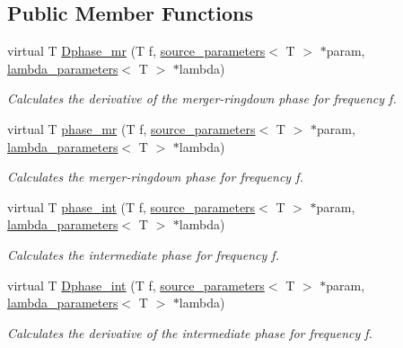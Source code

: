 \subsection*{Public Member Functions}
\begin{DoxyCompactItemize}
\item 
virtual T \hyperlink{classppE__IMRPhenomD__IMR_a3fa643eca535e7bef26f70bd5ed4cbde}{Dphase\+\_\+mr} (T f, \hyperlink{structsource__parameters}{source\+\_\+parameters}$<$ T $>$ $\ast$param, \hyperlink{structlambda__parameters}{lambda\+\_\+parameters}$<$ T $>$ $\ast$lambda)
\begin{DoxyCompactList}\small\item\em Calculates the derivative of the merger-\/ringdown phase for frequency f. \end{DoxyCompactList}\item 
virtual T \hyperlink{classppE__IMRPhenomD__IMR_a3b64e9bbf566450687bcfaa85c0e493f}{phase\+\_\+mr} (T f, \hyperlink{structsource__parameters}{source\+\_\+parameters}$<$ T $>$ $\ast$param, \hyperlink{structlambda__parameters}{lambda\+\_\+parameters}$<$ T $>$ $\ast$lambda)
\begin{DoxyCompactList}\small\item\em Calculates the merger-\/ringdown phase for frequency f. \end{DoxyCompactList}\item 
virtual T \hyperlink{classppE__IMRPhenomD__IMR_a04dc31c54da6e199db28197665b469a1}{phase\+\_\+int} (T f, \hyperlink{structsource__parameters}{source\+\_\+parameters}$<$ T $>$ $\ast$param, \hyperlink{structlambda__parameters}{lambda\+\_\+parameters}$<$ T $>$ $\ast$lambda)
\begin{DoxyCompactList}\small\item\em Calculates the intermediate phase for frequency f. \end{DoxyCompactList}\item 
virtual T \hyperlink{classppE__IMRPhenomD__IMR_a1625961885f0bf0723d1c12818cca287}{Dphase\+\_\+int} (T f, \hyperlink{structsource__parameters}{source\+\_\+parameters}$<$ T $>$ $\ast$param, \hyperlink{structlambda__parameters}{lambda\+\_\+parameters}$<$ T $>$ $\ast$lambda)
\begin{DoxyCompactList}\small\item\em Calculates the derivative of the intermediate phase for frequency f. \end{DoxyCompactList}\item 
\mbox{\label{classppE__IMRPhenomD__IMR_a698b02b83bfbc22e5ebc0e2e4f2f82fe}} 

\end{DoxyCompactItemize}
